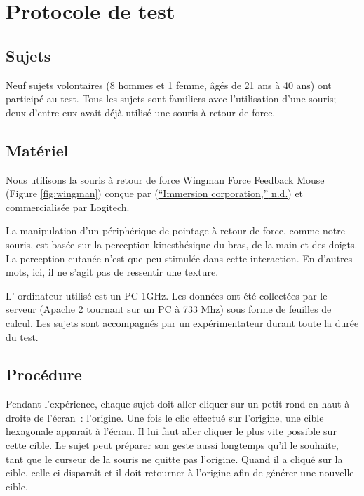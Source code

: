 \documentclass[
]{book}
\begin{document}
\hypertarget{protocole-de-test}{%
\section{Protocole de test}\label{protocole-de-test}}

\hypertarget{sujets}{%
\subsection{Sujets}\label{sujets}}

Neuf sujets volontaires (8 hommes et 1 femme, âgés de 21 ans à 40 ans) ont
participé au test. Tous les sujets sont familiers avec l'utilisation d'une
souris; deux d'entre eux avait déjà utilisé une souris à retour de force.

\hypertarget{matuxe9riel}{%
\subsection{Matériel}\label{matuxe9riel}}

Nous utilisons la souris à retour de force Wingman Force Feedback Mouse
(Figure \ref{fig:wingman}) conçue par (\protect\hyperlink{ref-ImmersionCorporation2005}{{``Immersion corporation,''} n.d.}) et
commercialisée par Logitech.

La manipulation d'un périphérique de pointage à retour de force, comme
notre souris, est basée sur la perception kinesthésique du bras, de la main
et des doigts. La perception cutanée n'est que peu stimulée dans cette
interaction. En d'autres mots, ici, il ne s'agit pas de ressentir une
texture.

L' ordinateur utilisé est un PC 1GHz. Les données ont été collectées par
le serveur (Apache 2 tournant sur un PC à 733 Mhz) sous forme de feuilles de
calcul. Les sujets sont accompagnés par un expérimentateur durant toute la
durée du test.

\hypertarget{procuxe9dure}{%
\subsection{Procédure}\label{procuxe9dure}}

Pendant l'expérience, chaque sujet doit aller cliquer sur un petit rond en
haut à droite de l'écran~: l'origine. Une fois le clic effectué sur l'origine,
une cible hexagonale apparaît à l'écran. Il lui faut aller cliquer le plus
vite possible sur cette cible. Le sujet peut préparer son geste aussi
longtemps qu'il le souhaite, tant que le curseur de la souris ne quitte pas
l'origine. Quand il a cliqué sur la cible, celle-ci disparaît et il doit
retourner à l'origine afin de générer une nouvelle cible.
\end{document}
